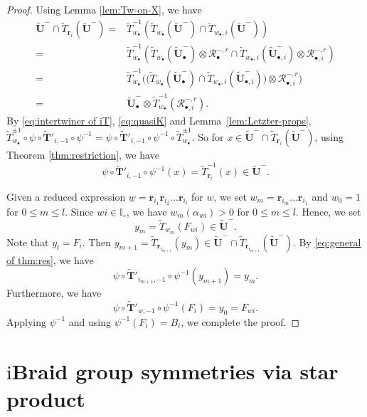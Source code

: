 \documentclass[a4paper,reqno,12pt]{amsart}
\numberwithin{equation}{section}
\theoremstyle{definition}
\theoremstyle{plain}
\theoremstyle{definition}
\def\I{\mathbb I}
\def\wI{\I_\circ}
\def\br{\mathbf r}
\def\tU{\widetilde{\mathbf U}}
\def \tbU{\tU_{\bullet}}
\def \tbiU{\tU_{\bullet,i}}
\def\tTD{\widetilde T}
\def\tTT{\widetilde{\mathbf T}}
\def\cR{\mathcal R}
\newcommand{\tTa}[1]{\tTT'_{#1,-1}}
\begin{document}
\begin{proof}
Using Lemma \ref{lem:Tw-on-X}, we have
\begin{align*}
  \tU^-\cap\tTD_{\br_i}(\tU^-)=&\tTD_{w_\bullet}^{-1}(\tTD_{w_\bullet}(\tU^-)\cap\tTD_{w_\bullet,i}(\tU^-))\\
  =&\tTD_{w_\bullet}^{-1}(\tTD_{w_\bullet}(\tbU^-)\otimes\cR_\bullet^{-,r}\cap\tTD_{w_\bullet,i}(\tbiU^-)\otimes\cR_{\bullet,i}^{-,r})\\
  =&\tTD_{w_\bullet}^{-1}\Big(\big(\tTD_{w_\bullet}(\tbU^-)\cap\tTD_{w_\bullet,i}(\tbiU^-)\big)\otimes\cR_{\bullet,i}^{-,r}\Big)\\
  =&\tbU^-\otimes\tTD_{w_\bullet}^{-1}(\cR_{\bullet,i}^{-,r}).
\end{align*}
By \eqref{eq:intertwiner of iT}, \eqref{eq:quasiK} and Lemma~\ref{lem:Letzter-props}, $\tTD_{w_\bullet}^{\pm1}\circ\psi\circ\tTa{i}\circ\psi^{-1}=\psi\circ\tTa{i}\circ\psi^{-1}\circ\tTD_{w_\bullet}^{\pm1}$.
So for $x\in\tU^-\cap\tTD_{\br_i}(\tU^-)$, using Theorem \ref{thm:restriction}, we have
\begin{equation}\label{eq:general of thm:res}
    \psi\circ\tTa{i}\circ\psi^{-1}(x)=\tTD_{\br_i}^{-1}(x)\in\tU^-.
\end{equation}

Given a reduced expression $\underline{w} =\br_{i_1} \br_{i_2} \ldots \br_{i_l}$ for $w$, we set $w_m=\br_{i_m} \ldots \br_{i_1}$ and $w_{0}=1$ for $0\leq m\leq l$. Since $wi\in \wI$, we have $w_m(\alpha_{wi})>0$ for $0\leq m\leq l$. Hence, we set
\begin{equation*}
    y_m=\tTD_{w_m}(F_{wi})\in\tU^-.
\end{equation*}
Note that $y_l=F_i$. Then $y_{m+1}=\tTD_{\br_{i_{m+1}}}(y_m)\in\tU^-\cap\tTD_{\br_{i_{m+1}}}(\tU^-)$. By \eqref{eq:general of thm:res}, we have
\begin{equation*}
 \psi\circ\tTa{i_{m+1}}\circ\psi^{-1}(y_{m+1}) =y_m.  
\end{equation*}
Furthermore, we have
\begin{equation*}
  \psi\circ\tTT'_{\underline{w},-1}\circ\psi^{-1}(F_i)=y_0=F_{wi}.  
\end{equation*}
Applying $\psi^{-1}$ and using $\psi^{-1}(F_i)=B_i$, we complete the proof.
\end{proof}

\section{\texorpdfstring{$\mathrm i$}{i}Braid group symmetries via star product}
\label{sec:global} 
\end{document}

